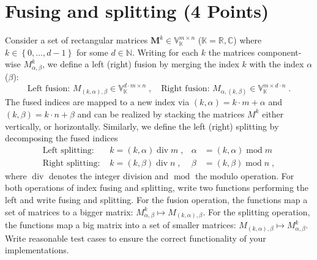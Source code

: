 \documentclass[a4paper, 12pt]{article}
\begin{document}
%
\section{Fusing and splitting \textbf{(4 Points)}}
%
Consider a set of rectangular matrices $\mathbf{M}^k\in \mathbb V_{\mathbb K}^{m\times n}$ ($\mathbb K = \mathbb R, \mathbb C$) where $k\in \left\{ 0,\ldots,d-1 \right\}$ for some $d\in\mathbb N$.
%
Writing for each $k$ the matrices component-wise $M^k_{\alpha, \beta}$, we define a left (right) fusion by merging the index $k$ with the index $\alpha$ ($\beta$):
\begin{equation}
	\text{Left fusion: } M_{(k,\alpha), \beta} \in \mathbb V_{\mathbb K}^{d\cdot m \times n} \;, \quad
	\text{Right fusion: } M_{\alpha, (k,\beta)} \in \mathbb V_{\mathbb K}^{m \times d\cdot n} \; .
\end{equation}
%
The fused indices are mapped to a new index via $(k,\alpha) = k\cdot m + \alpha$ and $(k,\beta) = k\cdot n + \beta$ and can be realized by stacking the matrices $M^k$ either vertically, or horizontally.
%
Similarly, we define the left (right) splitting by decomposing the fused indices
\begin{align}
	\text{Left splitting: } &k = (k,\alpha) \operatorname{div} m\;, &\alpha &= (k,\alpha) \operatorname{mod} m \\
	\text{Right splitting: } &k = (k,\beta) \operatorname{div} n\;, &\beta &= (k,\beta) \operatorname{mod} n \; ,
\end{align}
where $\operatorname{div}$ denotes the integer division and $\operatorname{mod}$ the modulo operation.
%
For both operations of index fusing and splitting, write two functions performing the left and write fusing and splitting.
%
For the fusion operation, the functions map a set of matrices to a bigger matrix: $ M^k_{\alpha, \beta} \longmapsto M_{(k,\alpha), \beta}$.
%
For the splitting operation, the functions map a big matrix into a set of smaller matrices: $ M_{(k,\alpha), \beta} \longmapsto M^k_{\alpha, \beta}$.
%
Write reasonable test cases to ensure the correct functionality of your implementations.
%

%
\end{document}
